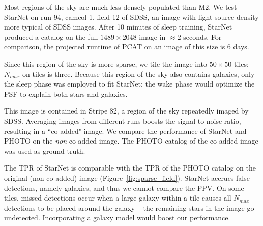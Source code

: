 Most regions of the sky are much less densely populated than M2. 
We test StarNet on run 94, camcol 1, field 12 of SDSS,
an image with light source density more typical of SDSS images.
After 10 minutes of sleep training, StarNet produced a catalog on the full $1489\times 2048$ image in $\approx2$ seconds. 
For comparison, the projected runtime of PCAT on an image of this size is 6 days.  

Since this region of the sky is more sparse, we tile the image into $50\times 50$ tiles; $N_{max}$ on tiles is three. 
Because this region of the sky also contains galaxies, only the sleep phase was employed to fit StarNet; 
the wake phase would optimize the PSF to explain both stars and galaxies. 

This image is contained in Stripe 82, a region of the sky repeatedly imaged by SDSS.
Averaging images from different runs boosts the signal to noise ratio, resulting in a ``co-added" image. 
We compare the performance of StarNet and PHOTO on the {\itshape non} co-added image. 
The PHOTO catalog of the co-added image was used as ground truth. 

The TPR of StarNet is comparable with the TPR of the PHOTO catalog on the original (non co-added) image (Figure~\ref{fig:sparse_field}). 
StarNet accrues false detections, namely galaxies, and thus we cannot compare the PPV. 
On some tiles, missed detections occur when a large galaxy within a tile causes all $N_{max}$ detections to be placed around the galaxy -- the remaining stars in the image go undetected. 
Incorporating a galaxy model would boost our performance. 


